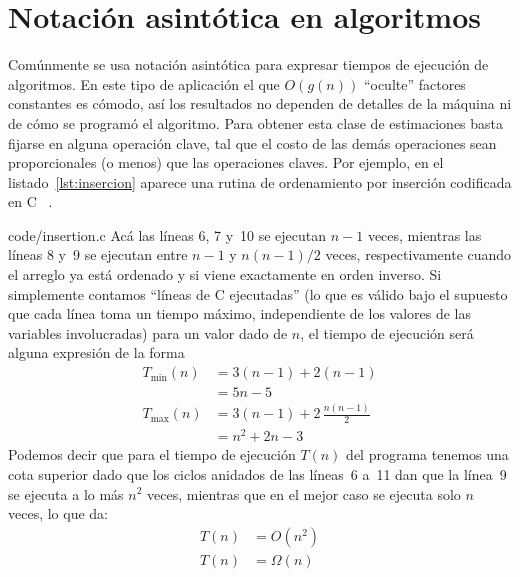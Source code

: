 \section{Notación asintótica en algoritmos}
\label{sec:asintotica-algoritmos}

  Comúnmente se usa notación asintótica
  para expresar tiempos de ejecución
  de algoritmos.
  En este tipo de aplicación
  el que \(O(g(n))\) ``oculte'' factores constantes
  es cómodo,
  así los resultados no dependen de detalles de la máquina
  ni de cómo se programó el algoritmo.
  Para obtener esta clase de estimaciones
  basta fijarse en alguna operación clave,
  tal que el costo de las demás operaciones sean proporcionales
  (o menos)
  que las operaciones claves.
  Por ejemplo,
  en el listado~\ref{lst:insercion}
  aparece una rutina de ordenamiento por inserción%
  codificada en C~%
    \cite{kernighan88:_c_progr_lang}.%
  
		   {code/insertion.c}
  Acá las líneas 6, 7 y~10 se ejecutan \(n - 1\) veces,
  mientras las líneas 8 y~9
  se ejecutan entre \(n - 1\) y \(n (n - 1) / 2\) veces,
  respectivamente cuando el arreglo ya está ordenado
  y si viene exactamente en orden inverso.%
  Si simplemente contamos ``líneas de C ejecutadas''
  (lo que es válido
   bajo el supuesto que cada línea toma un tiempo máximo,
   independiente de los valores de las variables involucradas)
  para un valor dado de \(n\),
  el tiempo de ejecución será alguna expresión de la forma
  \begin{align*}
    T_{\text{min}}(n)
      &= 3 (n - 1) + 2 (n - 1) \\
      &= 5 n - 5 \\
    T_{\text{max}}(n)
      &= 3 (n - 1) + 2 \, \frac{n (n - 1)}{2} \\
      &= n^2 + 2 n - 3
  \end{align*}
  Podemos decir
  que para el tiempo de ejecución \(T(n)\) del programa
  tenemos una cota superior dado que los ciclos anidados
  de las líneas~6 a~11
  dan que la línea~9 se ejecuta a lo más \(n^2\) veces,
  mientras que en el mejor caso se ejecuta solo \(n\) veces,
  lo que da:
  \begin{align*}
    T(n)
      &= O(n^2) \\
    T(n)
      &= \Omega(n)
  \end{align*}
